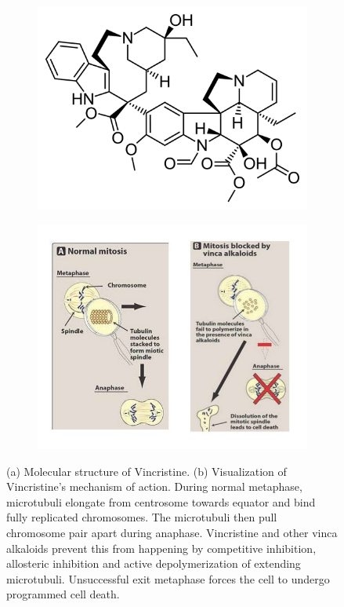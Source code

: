 \documentclass[pdftex,12pt,a4paper]{report}
\begin{document}
\begin{figure}[H]
\centering
\begin{subfigure}{.8\textwidth}
  \centering
  \includegraphics[width=.6\textwidth]{images/vincristine}
  \caption{}
  \label{fig:vincristine}
\end{subfigure}
\centering
\begin{subfigure}{.9\textwidth}
  \centering
  \includegraphics[width=.8\textwidth]{images/vincristine_mechanism}
  \caption{}
  \label{fig:anthracyclines_dna}
\end{subfigure}
\caption{(a) Molecular structure of Vincristine. (b) Visualization of Vincristine's mechanism of action. During normal metaphase, microtubuli elongate from centrosome towards equator and bind fully replicated chromosomes. The microtubuli then pull chromosome pair apart during anaphase. Vincristine and other vinca alkaloids prevent this from happening by competitive inhibition, allosteric inhibition and active depolymerization of extending microtubuli. Unsuccessful exit metaphase forces the cell to undergo programmed cell death.}
\label{fig:vincs}
\end{figure}
\end{document}
